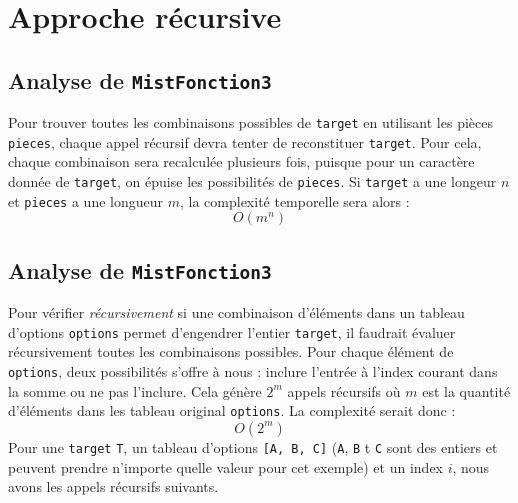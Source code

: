 \documentclass[10pt]{report}
\begin{document}
  \section{Approche récursive}
  \subsection{Analyse de {\texttt{MistFonction3}}}
  Pour trouver toutes les combinaisons possibles de \texttt{target} en utilisant les 
  pièces \texttt{pieces}, chaque appel récursif devra tenter de reconstituer 
  \texttt{target}. Pour cela, chaque combinaison sera recalculée plusieurs fois, 
  puisque pour un caractère donnée de \texttt{target}, on épuise les 
  possibilités de \texttt{pieces}. Si \texttt{target} a une longeur $n$ 
  et \texttt{pieces} a une longueur $m$, la complexité temporelle sera alors :
  \[ O(m^n) \]




  \subsection{Analyse de {\texttt{MistFonction3}}}
  Pour vérifier \textit{récursivement}   
  si une combinaison d'éléments dans un tableau d'options \texttt{options} 
  permet d'engendrer l'entier \texttt{target}, il faudrait évaluer 
  récursivement toutes les combinaisons possibles. Pour chaque élément 
  de \texttt{options}, deux possibilités s'offre à nous : inclure l'entrée à l'index 
  courant dans la somme ou ne pas l'inclure. Cela génère $2^m$ appels récursifs 
  où $m$ est la quantité d'éléments dans les tableau original \texttt{options}.   
  La complexité serait donc :
  \[ O(2^m) \]
  Pour une \texttt{target} \texttt{T}, un tableau d'options \texttt{[A, B, C]} 
  (\texttt{A}, \texttt{B} t \texttt{C} sont des entiers et peuvent prendre n'importe quelle 
  valeur pour cet exemple) et un 
  index $i$, nous avons les appels récursifs suivants. 


\end{document}

